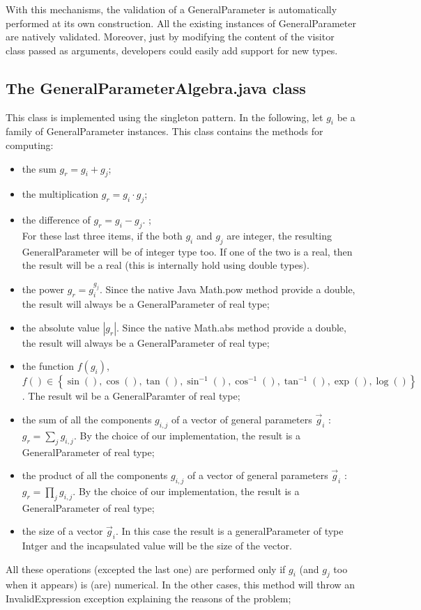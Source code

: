 \documentclass[a4paper,11pt] {ivoa}
\begin{document}
With this mechanisms, the validation of a GeneralParameter is automatically performed at its own construction. All the existing instances of GeneralParameter are natively validated. Moreover, just by modifying the content of the visitor class passed as arguments, developers could easily add support for new types. 

\subsection{The GeneralParameterAlgebra.java class}  
This class is implemented using the singleton pattern. In the following, let $g_i$ be a family of GeneralParameter instances.
This class  contains the methods for computing:
\begin{itemize}
\item  the sum $g_r = g_i + g_j$;\\
\item the multiplication $g_r = g_i \cdot g_j$;\\
\item the difference of $g_r = g_i - g_j$. ;\\
For these last three items, if the both $g_i$ and $g_j$ are integer, the resulting GeneralParameter will be of integer type too. If one of the two is a real, then the result will be a real (this is internally hold using double types).\\
\item the power $g_r = g_i^{g_j}$. Since the native Java Math.pow method provide a double, the result will always 
be a GeneralParameter of real type;\\
\item the absolute value $|g_r|$. Since the native Math.abs method provide a double, the result will always be a GeneralParameter of real type;\\
\item the function $f(g_i)$, $\displaystyle f() \in \left\{ \sin() , \cos(), \tan(), \sin^{-1}(), \cos^{-1}(), \tan^{-1}(),  \exp(), \log() \right\}$. The result wil be a GeneralParamter of real type;
\item the sum of all the components $g_{i,j}$ of a vector of general parameters $\vec g_i$ : $g_r = \sum_j g_{i,j}$. By the choice of our implementation, the result is a GeneralParameter of real type;
\item the product of all the components $g_{i,j}$ of a vector of general parameters $\vec g_i$ : $g_r = \prod_j g_{i,j}$. By the choice of our implementation, the result is a GeneralParameter of real type;
\item the size of a vector $\vec g_i$. In this case the result is a generalParameter of type Intger and the incapsulated value will be the size of the vector.\\ 
\end{itemize} 
All  these operations (excepted the last one) are performed only if  $g_i$ (and $g_j$ too when it appears) is (are) numerical. In the other cases, this method will throw an InvalidExpression exception explaining the reasons of the problem;\\
\end{document}

